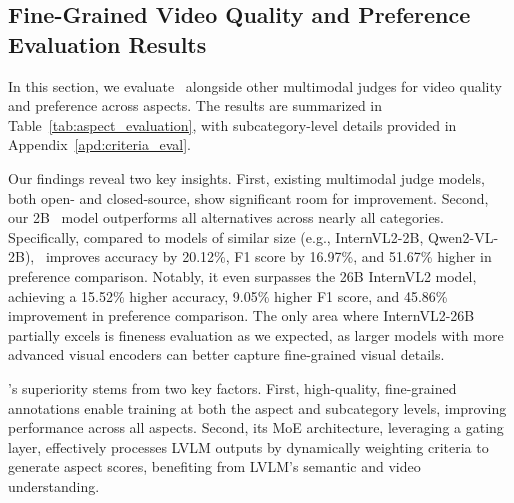 













\subsection{Fine-Grained Video Quality and Preference Evaluation Results}\label{sec:aspect_evaluation}
In this section, we evaluate \algname\ alongside other multimodal judges for video quality and preference across aspects. The results are summarized in Table~\ref{tab:aspect_evaluation}, with subcategory-level details provided in Appendix~\ref{apd:criteria_eval}. 

Our findings reveal two key insights. First, existing multimodal judge models, both open- and closed-source, show significant room for improvement. Second, our 2B \algname\ model outperforms all alternatives across nearly all categories. Specifically, compared to models of similar size (e.g., InternVL2-2B, Qwen2-VL-2B), \algname\ improves accuracy by 20.12\%, F1 score by 16.97\%, and 51.67\% higher in preference comparison. Notably, it even surpasses the 26B InternVL2 model, achieving a 15.52\% higher accuracy, 9.05\% higher F1 score, and 45.86\% improvement in preference comparison. The only area where InternVL2-26B partially excels is fineness evaluation as we expected, as larger models with more advanced visual encoders can better capture fine-grained visual details. 

\algname's superiority stems from two key factors. First, high-quality, fine-grained annotations enable training at both the aspect and subcategory levels, improving performance across all aspects. Second, its MoE architecture, leveraging a gating layer, effectively processes LVLM outputs by dynamically weighting criteria to generate aspect scores, benefiting from LVLM’s semantic and video understanding.















